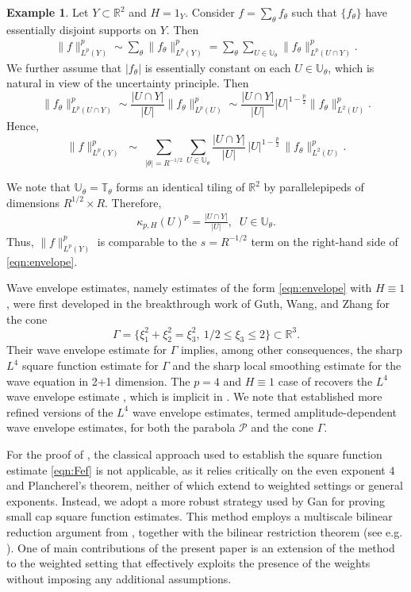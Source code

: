 \documentclass[11pt]{amsart}
\theoremstyle{definition}
\newtheorem{ex}{Example}
\theoremstyle{remark}
\newcommand{\R}{\mathbb{R}}
\newcommand{\cP}{\mathcal{P}}
\newcommand{\T}{\mathbb{T}}
\newcommand{\U}{\mathbb{U}}
\begin{document}
\begin{ex}
Let $Y\subset \R^2$ and $H=1_Y$. Consider $f=\sum_{\theta} f_\theta$ such that $\{f_\theta\}$ have essentially disjoint supports on $Y$. Then
\begin{align*}
	\| f\|_{L^p(Y)}^p \sim \sum_{\theta} \| f_\theta \|_{L^p(Y)}^p = \sum_{\theta} \sum_{U\in \U_\theta} \| f_\theta\|_{L^p(U\cap Y)}^p.
\end{align*}
We further assume that $|f_\theta|$ is  essentially constant on each $U\in \U_\theta$, which is natural in view of the uncertainty principle. Then
\begin{equation}\label{eqn:exKnapp}
	\| f_\theta\|_{L^p(U\cap Y)}^p 
	\sim \frac{|U\cap Y|}{|U|} \| f_\theta\|_{L^p(U)}^p 
	\sim \frac{|U\cap Y|}{|U|} |U|^{1-\frac{p}{2}} \| f_\theta\|_{L^2(U)}^p.
\end{equation}
Hence,
\[ 
\|f\|_{L^p(Y)}^p \;\sim\;
\sum_{|\theta|=R^{-1/2}} \sum_{U\in \U_\theta}
\frac{|U\cap Y|}{|U|}\,|U|^{1-\frac{p}{2}}\,
\big\|f_\theta\big\|_{L^2(U)}^{p}.
\]

We note that $\U_{\theta} = \T_\theta$ forms an identical tiling of $\R^2$ by parallelepipeds of dimensions $R^{1/2}\times R$. Therefore, 
\begin{align}\label{eqn:22}
	\kappa_{p,H}(U)^p = \frac{|U\cap Y|}{|U|}, \;\; U\in \U_\theta.
\end{align}
Thus, $\|f \|_{L^p(Y)}^p$ is comparable to the $s=R^{-1/2}$ term on the right-hand side of \eqref{eqn:envelope}.
\end{ex}


Wave envelope estimates, namely estimates of the form \eqref{eqn:envelope} with $H\equiv 1$, were first developed in the breakthrough work of Guth, Wang, and Zhang \cite{GWZ} for the cone 
\[
\Gamma=\{\xi_1^2+\xi_2^2=\xi_3^2,~1/2\le \xi_3\le2\} \subset \R^3.
\]
Their wave envelope estimate for $\Gamma$ implies, among other consequences, the sharp $L^4$ square function estimate for $\Gamma$ and the sharp local smoothing estimate for the wave equation in 2+1 dimension.
The $p=4$ and $H\equiv 1$ case of  recovers the $L^4$ wave envelope estimate \cite[Equation (8)]{GM1}, which is  implicit in \cite{GWZ}. 
We note that \cite{GM1} established more refined versions of the $L^4$ wave envelope estimates, termed amplitude-dependent wave envelope estimates, for both the parabola $\cP$ and the cone $\Gamma$.

For the proof of , the classical approach used to establish the square function estimate \eqref{eqn:Fef} is not applicable, as it relies critically on the even exponent $4$ and Plancherel’s theorem, neither of which extend to weighted settings or general exponents.  Instead, we adopt a more robust strategy used by Gan \cite{Gan} for proving small cap square function estimates. This method employs a multiscale bilinear reduction argument from \cite{BG, DGW}, together with the bilinear restriction theorem (see e.g. \cite{Tao}). One of  main contributions of the present paper is an extension of the method to the weighted setting that effectively exploits the presence of the weights without imposing any additional assumptions.
\end{document}
